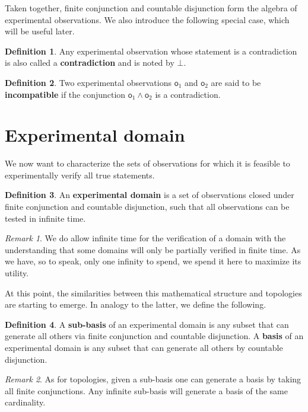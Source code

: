 \documentclass[preprint]{elsarticle}
\theoremstyle{plain}%
\theoremstyle{definition}
\newtheorem{defn}{Definition}[section]
\theoremstyle{remark}
\newtheorem*{rem}{Remark}
\begin{document}
Taken together, finite conjunction and countable disjunction form the algebra of experimental observations. We also introduce the following special case, which will be useful later.

\begin{defn}
Any experimental observation whose statement is a contradiction is also called a \textbf{contradiction} and is noted by $\bot$.
\end{defn}

\begin{defn}
Two experimental observations $\mathsf{o}_1$ and $\mathsf{o}_2$ are said to be \textbf{incompatible} if the conjunction $\mathsf{o}_1\wedge\mathsf{o}_2$ is a contradiction.
\end{defn}


\section{Experimental domain}

We now want to characterize the sets of observations for which it is feasible to experimentally verify all true statements.

\begin{defn}
	An \textbf{experimental domain} is a set of observations closed under finite conjunction and countable disjunction, such that all observations can be tested in infinite time. 
\end{defn}

\begin{rem}
	We do allow infinite time for the verification of a domain with the understanding that some domains will only be partially verified in finite time. As we have, so to speak, only one infinity to spend, we spend it here to maximize its utility.
\end{rem}

At this point, the similarities between this mathematical structure and topologies are starting to emerge. In analogy to the latter, we define the following.

\begin{defn}
	A \textbf{sub-basis} of an experimental domain is any subset that can generate all others via finite conjunction and countable disjunction. A \textbf{basis} of an experimental domain is any subset that can generate all others by countable disjunction.
\end{defn}

\begin{rem}
	As for topologies, given a sub-basis one can generate a basis by taking all finite conjunctions. Any infinite sub-basis will generate a basis of the same cardinality.
\end{rem}
\end{document}
